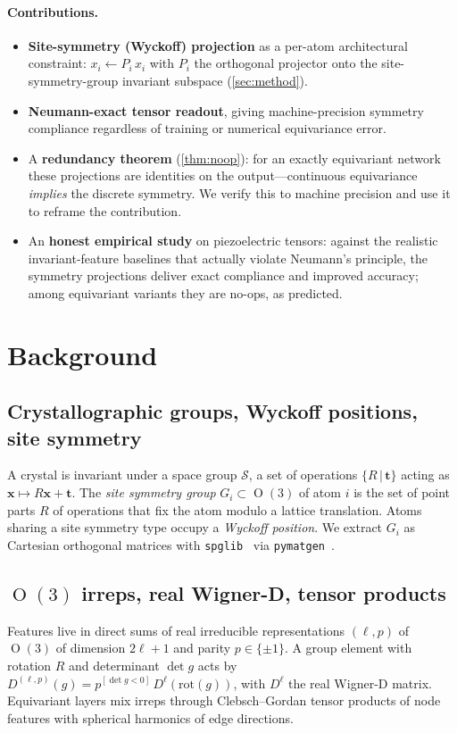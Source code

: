 \documentclass[11pt]{article}
\DeclareMathOperator{\Oo}{O}
\begin{document}
\paragraph{Contributions.}
\begin{itemize}[leftmargin=1.4em]
  \item \textbf{Site-symmetry (Wyckoff) projection} as a per-atom architectural
  constraint: $x_i \leftarrow P_i\,x_i$ with $P_i$ the orthogonal projector onto
  the site-symmetry-group invariant subspace (\cref{sec:method}).
  \item \textbf{Neumann-exact tensor readout}, giving machine-precision symmetry
  compliance regardless of training or numerical equivariance error.
  \item A \textbf{redundancy theorem} (\cref{thm:noop}): for an exactly
  equivariant network these projections are identities on the output---continuous
  equivariance \emph{implies} the discrete symmetry. We verify this to machine
  precision and use it to reframe the contribution.
  \item An \textbf{honest empirical study} on piezoelectric tensors: against the
  realistic invariant-feature baselines that actually violate Neumann's
  principle, the symmetry projections deliver exact compliance and improved
  accuracy; among equivariant variants they are no-ops, as predicted.
\end{itemize}

\section{Background}
\subsection{Crystallographic groups, Wyckoff positions, site symmetry}
A crystal is invariant under a space group $\mathcal{S}$, a set of operations
$\{R\,|\,\bm{t}\}$ acting as $\bm{x}\mapsto R\bm{x}+\bm{t}$. The \emph{site
symmetry group} $G_i\subset \Oo(3)$ of atom $i$ is the set of point parts $R$ of
operations that fix the atom modulo a lattice translation. Atoms sharing a site
symmetry type occupy a \emph{Wyckoff position}. We extract $G_i$ as Cartesian
orthogonal matrices with \texttt{spglib}~\cite{spglib2018} via
\texttt{pymatgen}~\cite{pymatgen2013}.

\subsection{$\Oo(3)$ irreps, real Wigner-D, tensor products}
Features live in direct sums of real irreducible representations $(\ell,p)$ of
$\Oo(3)$ of dimension $2\ell+1$ and parity $p\in\{\pm1\}$. A group element with
rotation $R$ and determinant $\det g$ acts by
$D^{(\ell,p)}(g)=p^{[\det g<0]}\,D^\ell(\mathrm{rot}(g))$, with $D^\ell$ the real
Wigner-D matrix. Equivariant layers mix irreps through Clebsch--Gordan tensor
products of node features with spherical harmonics of edge directions.
\end{document}
